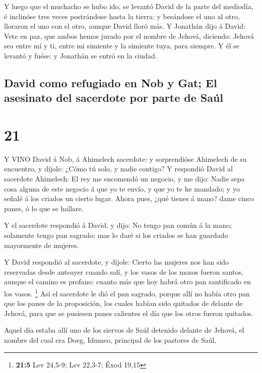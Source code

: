  Y luego que el muchacho se hubo ido, se levantó David de
la parte del mediodía, é inclinóse tres veces postrándose hasta la
tierra: y besándose el uno al otro, lloraron el uno con el otro, aunque
David lloró más.  Y Jonathán dijo á David: Vete en paz, que
ambos hemos jurado por el nombre de Jehová, diciendo: Jehová sea entre
mí y ti, entre mi simiente y la simiente tuya, para siempre. Y él se
levantó y fuése: y Jonathán se entró en la ciudad.

\hypertarget{david-como-refugiado-en-nob-y-gat-el-asesinato-del-sacerdote-por-parte-de-sauxfal}{%
\subsection{David como refugiado en Nob y Gat; El asesinato del
sacerdote por parte de
Saúl}\label{david-como-refugiado-en-nob-y-gat-el-asesinato-del-sacerdote-por-parte-de-sauxfal}}

\hypertarget{section-20}{%
\section{21}\label{section-20}}

 Y VINO David á Nob, á Ahimelech sacerdote: y sorprendióse
Ahimelech de su encuentro, y díjole: ¿Cómo tú solo, y nadie contigo?
 Y respondió David al sacerdote Ahimelech: El rey me
encomendó un negocio, y me dijo: Nadie sepa cosa alguna de este negocio
á que yo te envío, y que yo te he mandado; y yo señalé á los criados un
cierto lugar.  Ahora pues, ¿qué tienes á mano? dame cinco
panes, ó lo que se hallare.

 Y el sacerdote respondió á David, y dijo: No tengo pan
común á la mano; solamente tengo pan sagrado: mas lo daré si los criados
se han guardado mayormente de mujeres.

 Y David respondió al sacerdote, y díjole: Cierto las
mujeres nos han sido reservadas desde anteayer cuando salí, y los vasos
de los mozos fueron santos, aunque el camino es profano: cuanto más que
hoy habrá otro pan santificado en los vasos. \footnote{\textbf{21:5} Lev
  24,5-9; Lev 22,3-7; Éxod 19,15}  Así el sacerdote le dió
el pan sagrado, porque allí no había otro pan que los panes de la
proposición, los cuales habían sido quitados de delante de Jehová, para
que se pusiesen panes calientes el día que los otros fueron quitados.

 Aquel día estaba allí uno de los siervos de Saúl detenido
delante de Jehová, el nombre del cual era Doeg, Idumeo, principal de los
pastores de Saúl.

